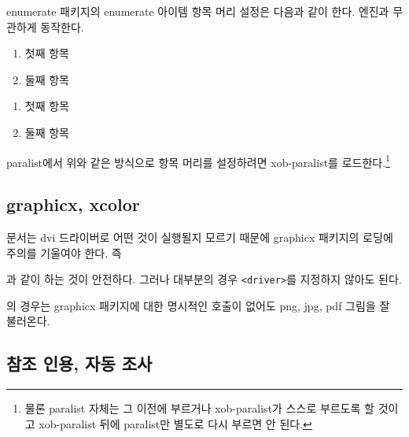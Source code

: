 \documentclass[
	12pt,
	a4paper,
	kosection,
	footnote,
	nobookmarks,
	microtype,
	figtabcapt,
]{oblivoir}
\newcommand\obclass{ob\-liv\-oir\oblivoirallowbreak}
\begin{document}
enumerate 패키지의 enumerate 아이템 항목 머리 설정은
다음과 같이 한다. 엔진과 무관하게 동작한다.
\begin{boxedverbatim}
\begin{enumerate}[(㉠)] \tightlist
\item 첫째 항목
\item 둘째 항목
\end{enumerate}
\end{boxedverbatim}
\begin{enumerate}[(㉠)] \tightlist
\item 첫째 항목
\item 둘째 항목
\end{enumerate}
paralist에서 위와 같은 방식으로 항목 머리를 설정하려면 
xob-paralist를 로드한다.\footnote{%
	물론 paralist 자체는 그 이전에 부르거나
	xob-paralist가 스스로 부르도록 할 것이고 xob-paralist 뒤에
	paralist만 별도로 다시 부르면 안 된다.
}

\subsection{graphicx, xcolor}

 문서는 dvi 드라이버로 어떤 것이 실행될지 모르기 때문에 graphicx 패키지의
로딩에 주의를 기울여야 한다. 즉
\begin{boxedverbatim}
\usepackage[<driver>]{graphicx}
\end{boxedverbatim}
과 같이 하는 것이 안전하다. 그러나 대부분의 경우 \verb|<driver>|를 지정하지 않아도 된다.

 \LuaTeX 의 경우는 graphicx 패키지에 대한 명시적인 호출이 없어도 
png, jpg, pdf 그림을 잘 불러온다. %

\subsection{참조 인용, 자동 조사}
\end{document}
